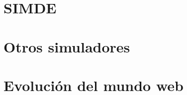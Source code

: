 

\section{SIMDE}
\label{2:sec1}


\section{Otros simuladores}
\label{2:sec2}



\section{Evolución del mundo web}
\label{2:sec3}



